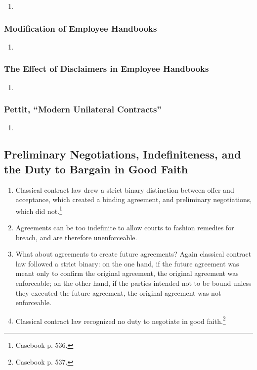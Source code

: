 \begin{enumerate}
    \item %
\end{enumerate}

\subsubsection{Modification of Employee Handbooks}

\begin{enumerate}
    \item %
\end{enumerate}

\subsubsection{The Effect of Disclaimers in Employee Handbooks}

\begin{enumerate}
    \item %
\end{enumerate}

\subsubsection{Pettit, ``Modern Unilateral Contracts''}

\begin{enumerate}
    \item %
\end{enumerate}

\newpage %

\subsection{Preliminary Negotiations, Indefiniteness, and the Duty to Bargain 
in Good Faith}

\begin{enumerate}
    \item Classical contract law drew a strict binary distinction between 
    offer and acceptance, which created a binding agreement, and preliminary 
    negotiations, which did not.\footnote{Casebook p. 536.}
    \item Agreements can be too indefinite to allow courts to fashion 
    remedies for breach, and are therefore unenforceable.
    \item What about agreements to create future agreements? Again classical 
    contract law followed a strict binary: on the one hand, if the future
    agreement was meant only to confirm the original agreement, the original 
    agreement was enforceable; on the other hand, if the parties intended not 
    to be bound unless they executed the future agreement, the original 
    agreement was not enforceable.
    \item Classical contract law recognized no duty to negotiate in good 
    faith.\footnote{Casebook p. 537.}
\end{enumerate}

